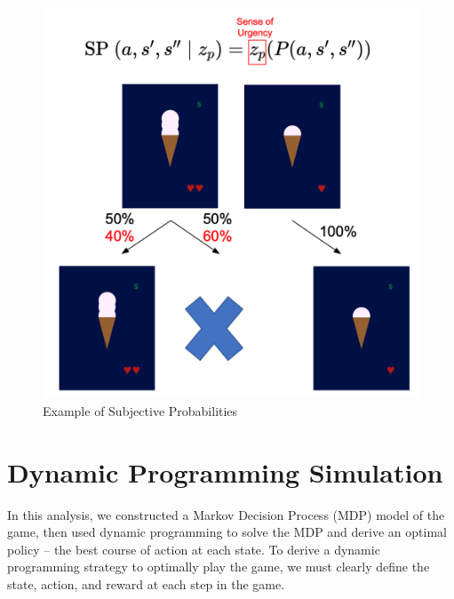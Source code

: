 \documentclass[
]{report}
\begin{document}
\begin{figure}
\begin{minipage}[t]{0.50\linewidth}
{{\includegraphics{images/sense-urgency-illustration.png}

}

}

\end{minipage}%

\caption{\label{fig-prob-weighting}Example of Subjective Probabilities}

\end{figure}

\hypertarget{dynamic-programming-simulation}{%
\section{Dynamic Programming
Simulation}\label{dynamic-programming-simulation}}

In this analysis, we constructed a Markov Decision Process (MDP) model
of the game, then used dynamic programming to solve the MDP and derive
an optimal policy -- the best course of action at each state. To derive
a dynamic programming strategy to optimally play the game, we must
clearly define the state, action, and reward at each step in the game.
\end{document}
